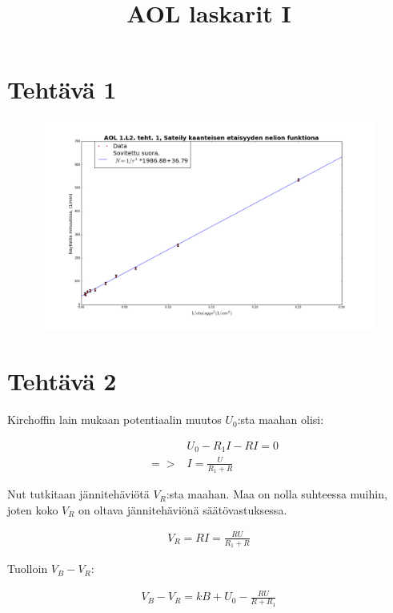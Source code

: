 \documentclass[a4paper, 12pt]{article}
\title{AOL laskarit I}
\begin{document}
\renewcommand{\headrulewidth}{0pt}
\setlength{\headheight}{25pt}
\pagestyle{fancy}

\section*{Tehtävä 1}
\begin{figure}[!hbt]
\includegraphics[width=0.99\textwidth]{1}
\end{figure}


\section*{Tehtävä 2}
Kirchoffin lain mukaan potentiaalin muutos $U_0$:sta maahan olisi:
\begin{center}
\begin{eqnarray*}
&& U_0 -R_1 I - R I = 0 \\ 
& => & I=\frac{U}{R_1 + R} 
\end{eqnarray*}
\end{center}

Nut tutkitaan jännitehäviötä $V_R$:sta maahan.
Maa on nolla suhteessa muihin, joten koko $V_R$ on oltava jännitehäviönä säätövastuksessa.

\begin{center}
\begin{eqnarray*}
V_R = R I = \frac{R U}{R_1 + R}
\end{eqnarray*}
\end{center}

Tuolloin $V_B - V_R$:

\begin{center}
\begin{eqnarray*}
V_B - V_R = k B + U_0 - \frac{R U}{R + R_1}
\end{eqnarray*}
\end{center}
\end{document}
